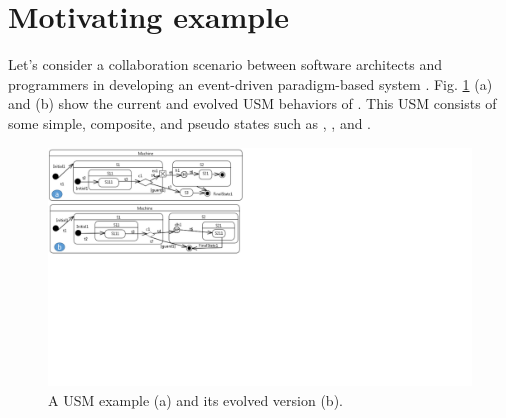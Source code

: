 \section{Motivating example%
	}
\label{sec:motivation}
Let's consider a collaboration scenario between software architects and programmers in developing an event-driven paradigm-based system . 
Fig. \ref{fig:illustration} (a) and (b) show the current and evolved USM behaviors of .
This USM consists of some simple, composite, and pseudo states such as , , and .

\begin{figure}
	\centering
	\includegraphics[clip, trim=0cm 10.6cm 18.3cm 0.1cm, width=1.0\columnwidth]{figures/illustration}
	\caption{A USM example (a) and its evolved version (b).} 
	\label{fig:illustration}
\end{figure}


